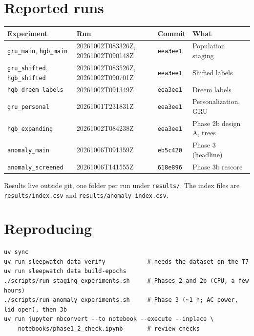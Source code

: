 \documentclass[11pt,a4paper]{article}
\newcommand{\code}[1]{\texttt{#1}}
\newcommand{\commit}[1]{\texttt{#1}}
\begin{document}
\section{Reported runs}
{\small
\begin{tabularx}{\linewidth}{>{\raggedright\arraybackslash}p{4.3cm}>{\raggedright\arraybackslash}p{4.6cm}lX}
\toprule
Experiment & Run & Commit & What \\
\midrule
\code{gru\_main}, \code{hgb\_main} & 20261002T083326Z, 20261002T090148Z & \commit{eea3ee1} & Population staging \\
\code{gru\_shifted}, \code{hgb\_shifted} & 20261002T083526Z, 20261002T090701Z & \commit{eea3ee1} & Shifted labels \\
\code{hgb\_dreem\_labels} & 20261002T091349Z & \commit{eea3ee1} & Dreem labels \\
\code{gru\_personal} & 20261001T231831Z & \commit{eea3ee1} & Personalization, GRU \\
\code{hgb\_expanding} & 20261002T084238Z & \commit{eea3ee1} & Phase 2b design A, trees \\
\code{anomaly\_main} & 20261006T091359Z & \commit{eb5c420} & Phase 3 (headline) \\
\code{anomaly\_screened} & 20261006T141555Z & \commit{618e896} & Phase 3b rescore \\
\bottomrule
\end{tabularx}}

\medskip
Results live outside git, one folder per run under \code{results/}. The index files are
\code{results/index.csv} and \code{results/anomaly\_index.csv}.

\section{Reproducing}
{\small
\begin{verbatim}
uv sync
uv run sleepwatch data verify            # needs the dataset on the T7
uv run sleepwatch data build-epochs
./scripts/run_staging_experiments.sh     # Phases 2 and 2b (CPU, a few hours)
./scripts/run_anomaly_experiments.sh     # Phase 3 (~1 h; AC power, lid open), then 3b
uv run jupyter nbconvert --to notebook --execute --inplace \
    notebooks/phase1_2_check.ipynb       # review checks
\end{verbatim}}
\end{document}
